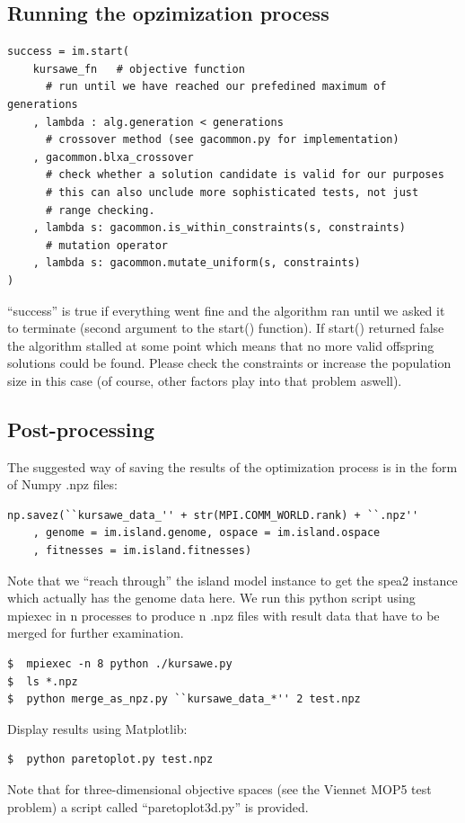 \documentclass[12pt]{article}
\begin{document}
\subsection{Running the opzimization process}
\begin{lstlisting}[style=Python]
success = im.start(
    kursawe_fn   # objective function
      # run until we have reached our prefedined maximum of generations
    , lambda : alg.generation < generations  
      # crossover method (see gacommon.py for implementation)
    , gacommon.blxa_crossover
      # check whether a solution candidate is valid for our purposes
      # this can also unclude more sophisticated tests, not just
      # range checking. 
    , lambda s: gacommon.is_within_constraints(s, constraints)
      # mutation operator
    , lambda s: gacommon.mutate_uniform(s, constraints)
)
\end{lstlisting}
``success'' is true if everything went fine and the algorithm ran until we asked it to terminate (second argument to the start() function). If start() returned false the algorithm stalled at some point which means that no more valid offspring solutions could be found. Please check the constraints or increase the population size in this case (of course, other factors play into that problem aswell). 
\subsection{Post-processing}
The suggested way of saving the results of the optimization process is in the form of Numpy .npz files:
\begin{lstlisting}[style=Python]
np.savez(``kursawe_data_'' + str(MPI.COMM_WORLD.rank) + ``.npz''
    , genome = im.island.genome, ospace = im.island.ospace 
    , fitnesses = im.island.fitnesses) 
\end{lstlisting}
Note that we ``reach through'' the island model instance to get the spea2 instance which actually has the genome data here. 
We run this python script using mpiexec in n processes to produce n .npz files with result data that have to be merged for further examination. 
\begin{lstlisting}[style=Python]
$  mpiexec -n 8 python ./kursawe.py
$  ls *.npz
$  python merge_as_npz.py ``kursawe_data_*'' 2 test.npz
\end{lstlisting}
Display results using Matplotlib: 
\begin{lstlisting}[style=Python]
$  python paretoplot.py test.npz
\end{lstlisting}
Note that for three-dimensional objective spaces (see the Viennet MOP5 test problem) a script called ``paretoplot3d.py'' is provided. 
\end{document}
